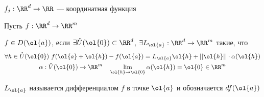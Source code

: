 \(
    f_j : \RR^d \to \RR
\) --- координатная функция

\begin{defn}{}{}
    Пусть \( f : \RR^d \to \RR^m \)

    \( f \in D(\ol{a}) \),
    если \( \exists \mathring{U}(\ol{0}) \subset \RR^d \),
    \( \exists L_{\ol{a}} : \RR^d \to \RR^m \) такие,
    что
    \begin{gather*}
        \forall h \in \mathring{U}(\ol{0}) \
            f(\ol{a} + \ol{h}) - f(\ol{a}) = L_{\ol{a}} \ol{h} + || \ol{h} || \cdot \alpha(\ol{h})
        \\
        \alpha : \mathring{V}(\ol{0}) \to \RR^m \quad \lim\limits_{\ol{h} \to \ol{0}} \alpha(\ol{h}) = \ol{0} \in \RR^m
    \end{gather*}

    \( L_{\ol{a}} \) называется дифференциалом \( f \) в точке \( \ol{a} \) и обозначается \( df(\ol{a}) \)
\end{defn}

